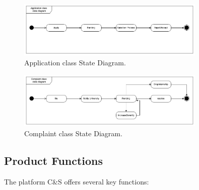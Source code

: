 \begin{figure}[H]
\centering
\includegraphics[width=0.8\textwidth]{Images/Application_State_Diagram.drawio.png}
\caption{\label{fig:metamodel1}Application class State Diagram.}
\end{figure}

\begin{figure}[H]
\centering
\includegraphics[width=0.8\textwidth]{Images/Complaint_state_Diagram.drawio.png}
\caption{\label{fig:metamodel1}Complaint class State Diagram.}
\end{figure}

\subsection{Product Functions}
The platform C\&S offers several key functions:

